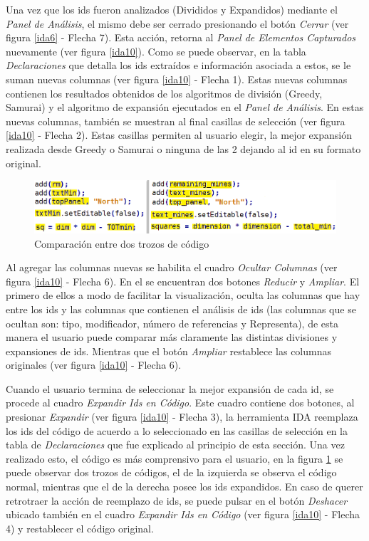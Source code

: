 Una vez que los ids fueron analizados (Divididos y Expandidos) mediante el \textit{Panel de Análisis}, el mismo debe ser cerrado presionando el botón \textit{Cerrar} (ver figura \ref{ida6} - Flecha 7). Esta acción, retorna al \textit{Panel de Elementos Capturados} nuevamente (ver figura \ref{ida10}).
Como se puede observar, en la tabla \textit{Declaraciones} que detalla los ids extraídos e información asociada a estos, se le suman nuevas columnas (ver figura \ref{ida10} - Flecha 1). Estas nuevas columnas contienen los resultados obtenidos de los algoritmos de división (Greedy, Samurai) y el algoritmo de expansión ejecutados en el \textit{Panel de Análisis}.
En estas nuevas columnas, también se muestran al final casillas de selección (ver figura \ref{ida10} - Flecha 2). Estas casillas permiten al usuario elegir, la mejor expansión realizada desde Greedy o Samurai o ninguna de las 2 dejando al id en su formato original.

\begin{figure}[t] %
\centerline{%
\includegraphics[scale= 0.55]{./cap4/ida_11.png}
}
\caption{Comparación entre dos trozos de código}
\label{ida11}
\end{figure}

Al agregar las columnas nuevas se habilita el cuadro \textit{Ocultar Columnas} (ver figura \ref{ida10} - Flecha 6). En el se encuentran dos botones \textit{Reducir} y \textit{Ampliar}. El primero de ellos a modo de facilitar la visualización, oculta las columnas que hay entre los ids y las columnas que contienen el análisis de ids (las columnas que se ocultan son: tipo, modificador, número de referencias y Representa), de esta manera el usuario puede comparar más claramente las distintas divisiones y expansiones de ids. Mientras que el botón \textit{Ampliar} restablece las columnas originales (ver figura \ref{ida10} - Flecha 6).

Cuando el usuario termina de seleccionar la mejor expansión de cada id, se procede al cuadro \textit{Expandir Ids en Código}. Este cuadro contiene dos botones, al presionar \textit{Expandir} (ver figura \ref{ida10} - Flecha 3), la herramienta IDA reemplaza los ids del código de acuerdo a lo seleccionado en las casillas de selección en la tabla de \textit{Declaraciones} que fue explicado al principio de esta sección.
Una vez realizado esto, el código es más comprensivo para el usuario, en la figura \ref{ida11} se puede observar dos trozos de códigos, el de la izquierda se observa el código normal, mientras que el de la derecha posee los ids expandidos.
En caso de querer retrotraer la acción de reemplazo de ids, se puede pulsar en el botón \textit{Deshacer} ubicado también en el cuadro \textit{Expandir Ids en Código} (ver figura \ref{ida10} - Flecha 4) y restablecer el código original.

